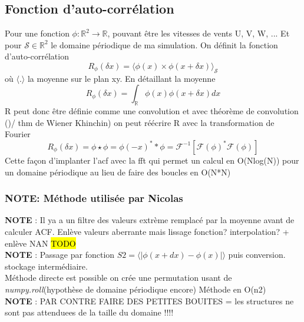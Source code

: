 \subsection{Fonction d'auto-corrélation}
Pour une fonction $\phi: \mathbb R^2 \longrightarrow \mathbb R$, pouvant être les vitesses de vents U, V, W, ... Et pour $\mathcal S \in \mathbb R^2$ le domaine périodique de ma simulation. On définit la fonction d'auto-corrélation 
\begin{equation}
R_{\phi}(\delta x) = \langle \phi(x) \times \phi(x+\delta x) \rangle _{\mathcal S}
\end{equation}
où $\langle . \rangle$ la moyenne sur le plan xy. En détaillant la moyenne \\
\begin{equation}
	R_{\phi}(\delta x) = \int_\mathbb{R} \phi(x) \phi(x+\delta x) dx
\end{equation}
R peut donc être définie comme une convolution et avec théorème de convolution ()/ thm de Wiener Khinchin) on peut réécrire R avec la transformation de Fourier
\begin{equation}
	R_{\phi}(\delta x) = \phi \star \phi = \phi(-x)^* \ast \phi  = \mathcal F ^{-1} \left[ \mathcal F(\phi)^* \mathcal F (\phi) \right]
\end{equation}
Cette façon d'implanter l'acf avec la fft qui permet un calcul en O(Nlog(N)) pour un domaine périodique au lieu de faire des boucles en O(N*N)


\subsubsection{NOTE: Méthode utilisée par Nicolas}
\textbf{NOTE} : Il ya a un filtre des valeurs extrème remplacé par la moyenne avant de calculer ACF. Enlève valeurs aberrante mais lissage fonction? interpolation? + enlève NAN \hl{TODO} \\
\textbf{NOTE} : Passage par fonction  $ S2 = \langle | \phi(x+ dx) - \phi(x) | \rangle $ puis conversion. stockage intermédiaire.  \\

Méthode directe est possible on crée une permutation usant de \textit{numpy.roll}(hypothèse de domaine périodique encore) Méthode en O(n2) \\

\textbf{NOTE} : PAR CONTRE FAIRE DES PETITES BOUITES = les structures ne sont pas attenduees de la taille du domaine !!!! 



